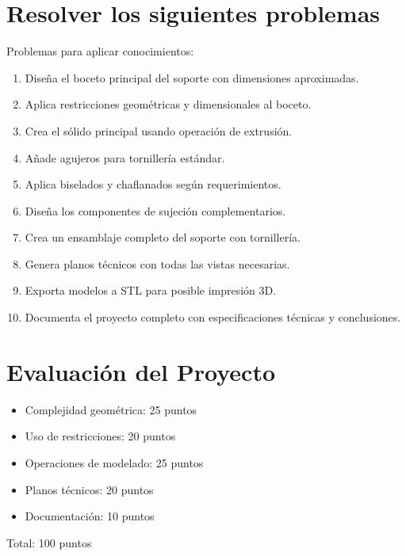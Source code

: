 \section{Resolver los siguientes problemas}
\faWrench

Problemas para aplicar conocimientos:
\begin{enumerate}
	\item Diseña el boceto principal del soporte con
	      dimensiones aproximadas.
	\item Aplica restricciones geométricas y dimensionales
	      al boceto.
	\item Crea el sólido principal usando operación de
	      extrusión.
	\item Añade agujeros para tornillería estándar.
	\item Aplica biselados y chaflanados según requerimientos.
	\item Diseña los componentes de sujeción complementarios.
	\item Crea un ensamblaje completo del soporte con
	      tornillería.
	\item Genera planos técnicos con todas las vistas
	      necesarias.
	\item Exporta modelos a STL para posible impresión
	      3D.
	\item Documenta el proyecto completo con especificaciones
	      técnicas y conclusiones.
\end{enumerate}

\section{Evaluación del Proyecto}
\begin{itemize}
	\item Complejidad geométrica: 25 puntos
	\item Uso de restricciones: 20 puntos
	\item Operaciones de modelado: 25 puntos
	\item Planos técnicos: 20 puntos
	\item Documentación: 10 puntos
\end{itemize}

Total: 100 puntos